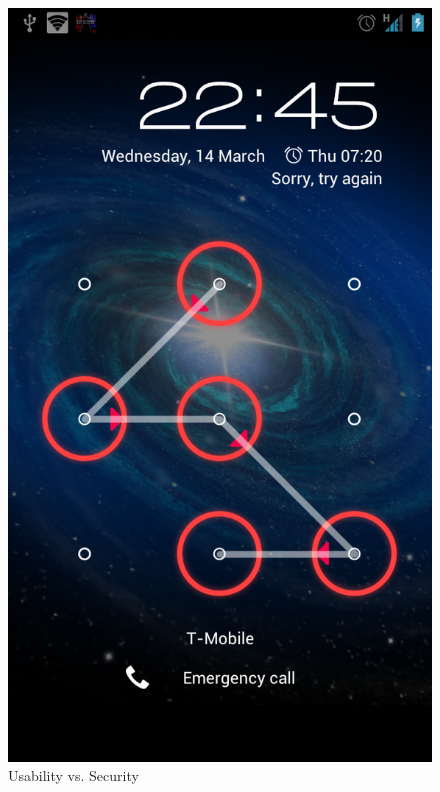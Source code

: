       \begin{figure}
      \vspace{-20pt}
      \begin{center}
        \includegraphics[scale=0.2]{pics/patternLock.png}
      \end{center}
      \vspace{-5pt}
      \caption{Usability vs. Security}
      \vspace{-10pt}
    \end{figure}

